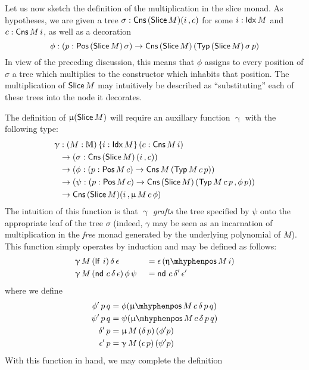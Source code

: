 Let us now sketch the definition of the multiplication in the slice
monad.  As hypotheses, we are given a tree
$\sigma : \mathsf{Cns}\, (\mathsf{Slice}\, M) (i \,, c)$ for some $i : \mathsf{Idx}\, M$ and
$c : \mathsf{Cns}\, M\, i$, as well as a decoration
$$\phi : (p : \mathsf{Pos}\, (\mathsf{Slice}\, M)\, \sigma) \to \mathsf{Cns}\, (\mathsf{Slice}\, M)\, (\mathsf{Typ}\,
(\mathsf{Slice}\, M)\, \sigma\, p)$$  In view of the preceding discussion, this
means that $\phi$ assigns to every position of $\sigma$ a tree which
multiplies to the constructor which inhabits that position.  The
multiplication of $\mathsf{Slice}\, M$ may intuitively be described as
``substituting'' each of these trees into the node it decorates.

The definition of $\upmu (\mathsf{Slice}\, M)$ will require an auxillary
function $\upgamma$ with the following type:
\begin{align*}
  \upgamma &: (M : \mathbb{M})\, \{i : \mathsf{Idx}\, M\}\, (c : \mathsf{Cns}\, M\, i) \\
           &\to (\sigma : \mathsf{Cns}\, (\mathsf{Slice}\, M)\, (i \,, c)) \\
           &\to (\phi : (p : \mathsf{Pos}\, M\, c) \to \mathsf{Cns}\, M\, (\mathsf{Typ}\, M\, c\, p)) \\
           &\to (\psi : (p : \mathsf{Pos}\, M\, c) \to \mathsf{Cns}\, (\mathsf{Slice}\, M)\, (\mathsf{Typ}\, M\, c\, p \,, \phi\, p)) \\
           &\to \mathsf{Cns}\, (\mathsf{Slice}\, M) (i \,, \upmu\, M\, c\, \phi)
\end{align*}
The intuition of this function is that $\upgamma$ \emph{grafts} the
tree specified by $\psi$ onto the appropriate leaf of the tree
$\sigma$ (indeed, $\gamma$ may be seen as an incarnation of
multiplication in the \emph{free} monad generated by the underlying
polynomial of $M$).  This function simply operates by induction and
may be defined as follows:
\begin{align*}
  &\upgamma\, M\, (\lf\, i)\, \delta\, \epsilon\, &&= \epsilon\, (\etapos M\, i) \\
  &\upgamma\, M\, (\nd\, c\, \delta\, \epsilon)\, \phi\, \psi\, &&= \nd\, c\, \delta'\, \epsilon'
\end{align*}
where we define
\begin{align*}
  \phi'\, p\, q &= \phi (\mupos M\, c\, \delta\, p\, q) \\
  \psi'\, p\, q &= \psi (\mupos M\, c\, \delta\, p\, q) \\
  \delta'\, p &= \upmu\, M\, (\delta\, p)\, (\phi' p) \\
  \epsilon'\, p &= \upgamma\, M\, (\epsilon\, p)\, (\psi' p)
\end{align*}
With this function in hand, we may complete the definition
